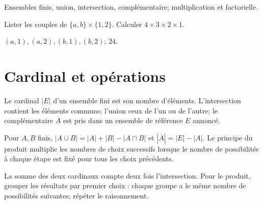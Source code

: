 \label{t11s-c19}
\begin{revision}Ensembles finis, union, intersection, complémentaire; multiplication et factorielle.\end{revision}
\begin{automatismes}\exo\label{t11s-c19-auto}Lister les couples de $\{a,b\}\times\{1,2\}$. Calculer $4\times3\times2\times1$.\end{automatismes}
\begin{corrige}\label{sol-t11s-c19-auto}$(a,1),(a,2),(b,1),(b,2)$; $24$.\end{corrige}

\section{Cardinal et opérations}
\begin{definition}Le cardinal $|E|$ d’un ensemble fini est son nombre d’éléments. L’intersection contient les éléments communs; l’union ceux de l’un ou de l’autre; le complémentaire $\overline A$ est pris dans un ensemble de référence $E$ annoncé.\end{definition}
\begin{propriete}Pour $A,B$ finis, $|A\cup B|=|A|+|B|-|A\cap B|$ et $|\overline A|=|E|-|A|$. Le principe du produit multiplie les nombres de choix successifs lorsque le nombre de possibilités à chaque étape est fixé pour tous les choix précédents.\end{propriete}
\begin{demonstration}La somme des deux cardinaux compte deux fois l’intersection. Pour le produit, grouper les résultats par premier choix : chaque groupe a le même nombre de possibilités suivantes; répéter le raisonnement.\end{demonstration}
